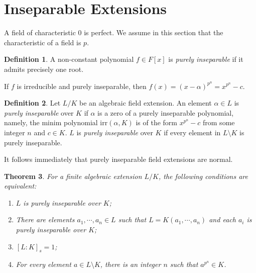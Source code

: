 \documentclass[12pt]{report}
\newtheorem{theorem}{Theorem}[section]
\theoremstyle{definition}
\newtheorem{definition}[theorem]{Definition}
\newcommand{\irr}{\text{irr}}
\begin{document}
\section{Inseparable Extensions}

A field of characteristic 0 is perfect. We assume in this section that the characteristic of a field is $p$.

\begin{definition}
	A non-constant polynomial $f\in F[x]$ is \emph{purely inseparable} if it admits precisely one root.
\end{definition}

If $f$ is irreducible and purely inseparable, then $f(x)=(x-\alpha)^{p^n} = x^{p^n}-c$.

\begin{definition}
	Let $L/K$ be an algebraic field extension. An element $\alpha\in L$ is \emph{purely inseparable} over $K$ if $\alpha$ is a zero of a purely inseparable polynomial, namely, the minim polynomial $\irr(\alpha,K)$ is of the form $x^{p^n}-c$ from some integer $n$ and $c\in K$. $L$ is \emph{purely inseparable} over $K$ if every element in $L\setminus K$ is purely inseparable.
\end{definition}

It follows immediately that purely inseparable field extensions are normal.

\begin{theorem}
	For a finite algebraic extension $L/K$, the following conditions are equivalent: \begin{enumerate}
		\item $L$ is purely inseparable over $K$;
		\item There are elements $a_1,\cdots,a_n\in L$ such that $L=K(a_1,\cdots,a_n)$ and each $a_i$ is purely inseparable over $K$;
		\item $[L:K]_s=1$;
		\item For every element $a\in L\setminus K$, there is an integer $n$ such that $a^{p^n}\in K$.
	\end{enumerate}
\end{theorem}
\end{document}
